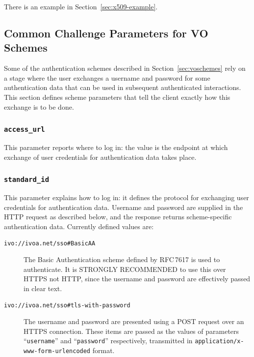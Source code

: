 \documentclass[11pt,a4paper]{ivoa}
\newcommand{\rfc}[1]{RFC\,#1}
\begin{document}
There is an example in Section~\ref{sec:x509-example}.


\subsection{Common Challenge Parameters for VO Schemes}
\label{sec:common-params}

Some of the authentication schemes described in Section~\ref{sec:voschemes}
rely on a stage where the user exchanges 
a username and password
for some authentication data that can be used in subsequent authenticated
interactions.
This section defines scheme parameters that
tell the client exactly how this exchange is to be done.

\subsubsection{\mbox{\tt access\_url}}
\label{sec:access-url}

This parameter reports where to log in:
the value is the endpoint at which
exchange of user credentials for authentication data
takes place.

\subsubsection{\mbox{\tt standard\_id}}
\label{sec:standard-id}

This parameter explains how to log in:
it defines the protocol for exchanging user credentials
for authentication data.
Username and password are supplied in the HTTP request as described below,
and the response returns scheme-specific authentication data.
Currently defined values are:

\begin{description}
  \item[{\tt ivo://ivoa.net/sso\#BasicAA}]
        The Basic Authentication scheme defined by \rfc{7617} is used to
        authenticate.
        It is STRONGLY RECOMMENDED to use this over HTTPS not HTTP,
        since the username and password are effectively passed in clear text.
  \item[{\tt ivo://ivoa.net/sso\#tls-with-password}]
        The username and password are presented using a POST request
        over an HTTPS connection.
        These items are passed as the values of parameters
        ``{\tt username}'' and ``{\tt password}'' respectively,
        transmitted in {\tt application/x-www-form-urlencoded} format.
\end{description}
\end{document}
